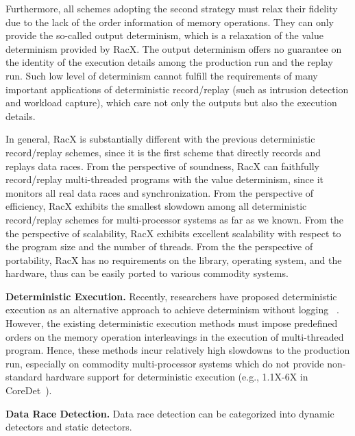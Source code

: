 \documentclass[10pt,onecolumn,letterpaper]{article}
\begin{document}
Furthermore, all schemes adopting the second strategy must relax
their fidelity due to the lack of the order information of memory
operations. They can only provide the so-called output determinism,
which is a relaxation of the value determinism provided by RacX. The
output determinism offers no guarantee on the identity of the
execution details among the production run and the replay run. Such
low level of determinism cannot fulfill the requirements of many
important applications of deterministic record/replay (such as
intrusion detection and workload capture), which care not only the
outputs but also the execution details.

In general, RacX is substantially different with the previous
deterministic record/replay schemes, since it is the first scheme
that directly records and replays data races. From the perspective
of soundness, RacX can faithfully record/replay multi-threaded
programs with the value determinism, since it monitors all real data
races and synchronization. From the perspective of efficiency, RacX
exhibits the smallest slowdown among all deterministic record/replay
schemes for multi-processor systems as far as we known. From the the
perspective of scalability, RacX exhibits excellent scalability with
respect to the program size and the number of threads. From the the
perspective of portability, RacX has no requirements on the library,
operating system, and the hardware, thus can be easily ported to
various commodity systems.

\noindent\textbf{Deterministic Execution.} Recently, researchers
have proposed deterministic execution as an alternative approach to
achieve determinism without logging
~\cite{Olszewski09ASPLOS,Bocchino09OOPSLA,Devietti09ASPLOS,Bergan10ASPLOS,Devietti11ASPLOS,Hower11HPCA}.
However, the existing deterministic execution methods must impose
predefined orders on the memory operation interleavings in the
execution of multi-threaded program. Hence, these methods incur
relatively high slowdowns to the production run, especially on
commodity multi-processor systems which do not provide non-standard
hardware support for deterministic execution (e.g., 1.1X-6X in
CoreDet~\cite{Bergan10ASPLOS}).

\noindent\textbf{Data Race Detection.} Data race detection can be
categorized into dynamic detectors and static detectors.
\end{document}
